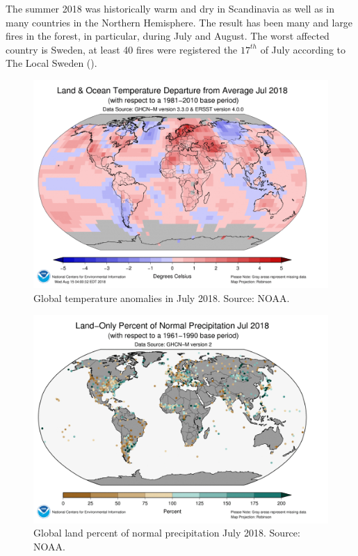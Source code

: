\documentclass[a4paper, article, oneside, UKenglish]{memoir}
\newcommand{\0}{\mathbf{0}}
\newcommand{\1}{\mathbf{1}}
\begin{document}
The summer 2018 was historically warm and dry in Scandinavia as well as in many countries in the Northern Hemisphere. The result has been many and large fires in the forest, in particular, during July and August. The worst affected country is Sweden, at least 40 fires were registered the $17^{th}$ of July according to The Local Sweden (\cite{the_local_sweden}).

\begin{figure}
    \centering
    \includegraphics[scale=0.4]{NOAA/warm_anomalies.png}
    \caption{Global temperature anomalies in July 2018. Source: NOAA.}
    \label{fig:temperature_anomalies}
\end{figure}


\begin{figure}
    \centering
    \includegraphics[scale=0.4]{NOAA/dry_anomalies.png}
    \caption{Global land percent of normal precipitation July 2018. Source: NOAA.}
    \label{fig:precipitation_percent}
\end{figure}
\end{document}

